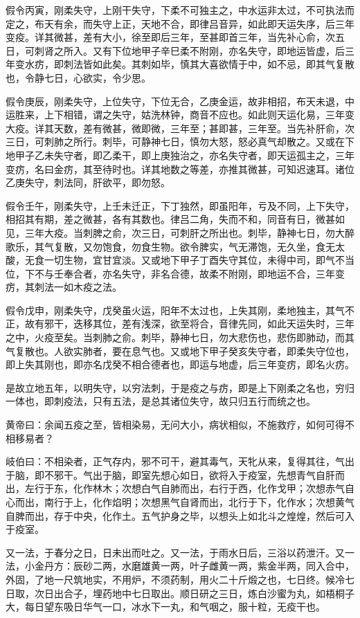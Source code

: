 \documentclass{article}%
\begin{document}
假令丙寅，刚柔失守，上刚干失守，下柔不可独主之，中水运非太过，不可执法而定之，布天有余，而失守上正，天地不合，即律吕音异，如此即天运失序，后三年变疫。详其微甚，差有大小，徐至即后三年，至甚即首三年，当先补心俞，次五日，可刺肾之所入。又有下位地甲子辛巳柔不附刚，亦名失守，即地运皆虚，后三年变水疠，即刺法皆如此矣。其刺如毕，慎其大喜欲情于中，如不忌，即其气复散也，令静七日，心欲实，令少思。

假令庚辰，刚柔失守，上位失守，下位无合，乙庚金运，故非相招，布天未退，中运胜来，上下相错，谓之失守，姑洗林钟，商音不应也。如此则天运化易，三年变大疫。详其天数，差有微甚，微即微，三年至；甚即甚，三年至。当先补肝俞，次三日，可刺肺之所行。刺毕，可静神七日，慎勿大怒，怒必真气却散之。又或在下地甲子乙未失守者，即乙柔干，即上庚独治之，亦名失守者，即天运孤主之，三年变疠，名曰金疠，其至待时也。详其地数之等差，亦推其微甚，可知迟速耳。诸位乙庚失守，刺法同，肝欲平，即勿怒。

假令壬午，刚柔失守，上壬未迁正，下丁独然，即虽阳年，亏及不同，上下失守，相招其有期，差之微甚，各有其数也。律吕二角，失而不和，同音有日，微甚如见，三年大疫。当刺脾之俞，次三日，可刺肝之所出也。刺毕，静神七日，勿大醉歌乐，其气复散，又勿饱食，勿食生物。欲令脾实，气无滞饱，无久坐，食无太酸，无食一切生物，宜甘宜淡。又或地下甲子丁酉失守其位，未得中司，即气不当位，下不与壬奉合者，亦名失守，非名合德，故柔不附刚，即地运不合，三年变疠，其刺法一如木疫之法。

假令戊申，刚柔失守，戊癸虽火运，阳年不太过也，上失其刚，柔地独主，其气不正，故有邪干，迭移其位，差有浅深，欲至将合，音律先同，如此天运失时，三年之中，火疫至矣。当刺肺之俞。刺毕，静神七日，勿大悲伤也，悲伤即肺动，而其气复散也。人欲实肺者，要在息气也。又或地下甲子癸亥失守者，即柔失守位也，即上失其刚也，即亦名戊癸不相合德者也，即运与地虚，后三年变疠，即名火疠。

是故立地五年，以明失守，以穷法刺，于是疫之与疠，即是上下刚柔之名也，穷归一体也，即刺疫法，只有五法，是总其诸位失守，故只归五行而统之也。

黄帝曰：余闻五疫之至，皆相染易，无问大小，病状相似，不施救疗，如何可得不相移易者？

岐伯曰：不相染者，正气存内，邪不可干，避其毒气，天牝从来，复得其往，气出于脑，即不邪干。气出于脑，即室先想心如日，欲将入于疫室，先想青气自肝而出，左行于东，化作林木；次想白气自肺而出，右行于西，化作戈甲；次想赤气自心而出，南行于上，化作焰明；次想黑气自肾而出，北行于下，化作水；次想黄气自脾而出，存于中央，化作土。五气护身之毕，以想头上如北斗之煌煌，然后可入于疫室。

又一法，于春分之日，日未出而吐之。又一法，于雨水日后，三浴以药泄汗。又一法，小金丹方：辰砂二两，水磨雄黄一两，叶子雌黄一两，紫金半两，同入合中，外固，了地一尺筑地实，不用炉，不须药制，用火二十斤煅之也，七日终。候冷七日取，次日出合子，埋药地中七日取出。顺日研之三日，炼白沙蜜为丸，如梧桐子大，每日望东吸日华气一口，冰水下一丸，和气咽之，服十粒，无疫干也。
\end{document}
